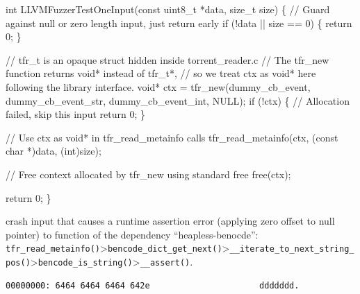 \documentclass[
  a4paper,
]{scrreprt}
\newenvironment{Shaded}{\begin{snugshade}}{\end{snugshade}}
\newcommand{\CommentTok}[1]{\textcolor[rgb]{0.41,0.41,0.41}{#1}}
\newcommand{\ControlFlowTok}[1]{\textcolor[rgb]{0.85,0.12,0.09}{#1}}
\newcommand{\DataTypeTok}[1]{\textcolor[rgb]{0.47,0.16,0.63}{#1}}
\newcommand{\DecValTok}[1]{\textcolor[rgb]{0.47,0.16,0.63}{#1}}
\newcommand{\NormalTok}[1]{\textcolor[rgb]{0.33,0.33,0.33}{#1}}
\newcommand{\OperatorTok}[1]{\textcolor[rgb]{0.00,0.46,0.62}{#1}}
\theoremstyle{definition}
\theoremstyle{remark}
\begin{document}
\begin{Shaded}
\begin{Highlighting}[numbers=left,,]
\DataTypeTok{int}\NormalTok{ LLVMFuzzerTestOneInput}\OperatorTok{(}\DataTypeTok{const} \DataTypeTok{uint8\_t} \OperatorTok{*}\NormalTok{data}\OperatorTok{,} \DataTypeTok{size\_t}\NormalTok{ size}\OperatorTok{)} \OperatorTok{\{}
    \CommentTok{// Guard against null or zero length input, just return early}
    \ControlFlowTok{if} \OperatorTok{(!}\NormalTok{data }\OperatorTok{||}\NormalTok{ size }\OperatorTok{==} \DecValTok{0}\OperatorTok{)} \OperatorTok{\{}
        \ControlFlowTok{return} \DecValTok{0}\OperatorTok{;}
    \OperatorTok{\}}

    \CommentTok{// tfr\_t is an opaque struct hidden inside torrent\_reader.c}
    \CommentTok{// The tfr\_new function returns void* instead of tfr\_t*,}
    \CommentTok{// so we treat ctx as void* here following the library interface.}
    \DataTypeTok{void}\OperatorTok{*}\NormalTok{ ctx }\OperatorTok{=}\NormalTok{ tfr\_new}\OperatorTok{(}\NormalTok{dummy\_cb\_event}\OperatorTok{,}\NormalTok{ dummy\_cb\_event\_str}\OperatorTok{,}\NormalTok{ dummy\_cb\_event\_int}\OperatorTok{,}\NormalTok{ NULL}\OperatorTok{);}
    \ControlFlowTok{if} \OperatorTok{(!}\NormalTok{ctx}\OperatorTok{)} \OperatorTok{\{}
        \CommentTok{// Allocation failed, skip this input}
        \ControlFlowTok{return} \DecValTok{0}\OperatorTok{;}
    \OperatorTok{\}}

    \CommentTok{// Use ctx as void* in tfr\_read\_metainfo calls}
\NormalTok{    tfr\_read\_metainfo}\OperatorTok{(}\NormalTok{ctx}\OperatorTok{,} \OperatorTok{(}\DataTypeTok{const} \DataTypeTok{char} \OperatorTok{*)}\NormalTok{data}\OperatorTok{,} \OperatorTok{(}\DataTypeTok{int}\OperatorTok{)}\NormalTok{size}\OperatorTok{);}

    \CommentTok{// Free context allocated by tfr\_new using standard free}
\NormalTok{    free}\OperatorTok{(}\NormalTok{ctx}\OperatorTok{);}

    \ControlFlowTok{return} \DecValTok{0}\OperatorTok{;}
\OperatorTok{\}}
\end{Highlighting}
\end{Shaded}

crash input that causes a runtime assertion error (applying zero offset
to null pointer) to function of the dependency ``heapless-benocde'':
\texttt{tfr\_read\_metainfo()}\textgreater{}\texttt{bencode\_dict\_get\_next()}\textgreater{}\texttt{\_\_iterate\_to\_next\_string\_pos()}\textgreater{}\texttt{bencode\_is\_string()}\textgreater{}\texttt{\_\_assert()}.

\begin{verbatim}
00000000: 6464 6464 6464 642e                      ddddddd.
\end{verbatim}
\end{document}
